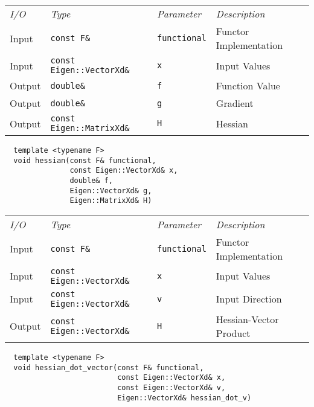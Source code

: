 \begin{tcolorbox}[colback=white,colframe=gray90, coltitle=black,boxrule=3pt,
fonttitle=\bfseries,title=Hessian]

\begin{tabular}{llll}
\textit{I/O} & \textit{Type} & \textit{Parameter} & \textit{Description} \\
Input & \texttt{const F\&} & \texttt{functional} & Functor Implementation \\
Input & \texttt{const Eigen::VectorXd\&} & \texttt{x} & Input Values \\
Output & \texttt{double\&} & \texttt{f} & Function Value \\
Output & \texttt{double\&} & \texttt{g} & Gradient \\
Output & \texttt{const Eigen::MatrixXd\&} & \texttt{H} & Hessian
\end{tabular}

\vspace{5mm}

\begin{verbatim}
  template <typename F>
  void hessian(const F& functional,
               const Eigen::VectorXd& x,
               double& f,
               Eigen::VectorXd& g,
               Eigen::MatrixXd& H)
\end{verbatim}

\end{tcolorbox}

\begin{tcolorbox}[colback=white,colframe=gray90, coltitle=black,boxrule=3pt,
fonttitle=\bfseries,title=Hessian-Vector Product]

\begin{tabular}{llll}
\textit{I/O} & \textit{Type} & \textit{Parameter} & \textit{Description} \\
Input & \texttt{const F\&} & \texttt{functional} & Functor Implementation \\
Input & \texttt{const Eigen::VectorXd\&} & \texttt{x} & Input Values \\
Input & \texttt{const Eigen::VectorXd\&} & \texttt{v} & Input Direction \\
Output & \texttt{const Eigen::VectorXd\&} & \texttt{H} & Hessian-Vector Product
\end{tabular}

\vspace{5mm}

\begin{verbatim}
  template <typename F>
  void hessian_dot_vector(const F& functional,
                          const Eigen::VectorXd& x,
                          const Eigen::VectorXd& v,
                          Eigen::VectorXd& hessian_dot_v)
\end{verbatim}

\end{tcolorbox}

